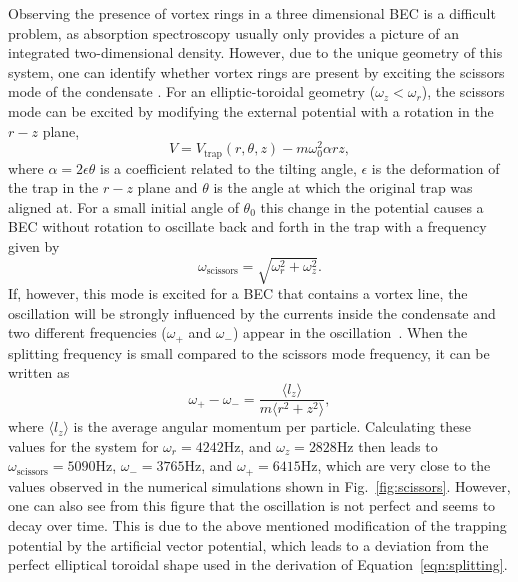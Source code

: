 Observing the presence of vortex rings in a three dimensional BEC is a difficult problem, as absorption spectroscopy usually only provides a picture of an integrated two-dimensional density.
However, due to the unique geometry of this system, one can identify whether vortex rings are present by exciting the scissors mode of the condensate \cite{cozzini2003, guery1999, marago2000}. 
For an elliptic-toroidal geometry ($\omega_z < \omega_r$), the scissors mode can be excited by modifying the external potential with a rotation in the $r-z$ plane,
\begin{equation}
        V = V_{\text{trap}}(r, \theta, z) -m\omega_0^2\alpha rz,
\end{equation}
where $\alpha = 2\epsilon\theta$ is a coefficient related to the tilting angle, $\epsilon$ is the deformation of the trap in the $r-z$ plane and $\theta$ is the angle at which the original trap was aligned at.
For a small initial angle of $\theta_0$ this change in the potential causes a BEC without rotation to oscillate back and forth in the trap with a frequency given by \cite{stringari2001}
\begin{equation}
        \omega_{\text{scissors}} = \sqrt{\omega_r^2+\omega_z^2}.
\end{equation}
If, however, this mode is excited for a BEC that contains a vortex line, the oscillation will be strongly influenced by the currents inside the condensate and two different frequencies ($\omega_+$ and $\omega_-$) appear in the oscillation~\cite{smith2004, zambelli1998, stringari2001}.
When the splitting frequency is small compared to the scissors mode frequency, it 
can be written as \cite{zambelli1998}
\begin{equation}
\omega_{+} - \omega_{-} = \frac{\langle l_z \rangle}{m\langle r^2 + z^2 \rangle},
\label{eqn:splitting}
\end{equation}
where $\langle l_z \rangle$ is the average angular momentum per particle.
Calculating these values for the system for $\omega_r = 4242$Hz, and $\omega_z = 2828$Hz then leads to $\omega_{\text{scissors}} = 5090$Hz, $\omega_{-} = 3765$Hz, and $\omega_{+} = 6415$Hz, which are very close to the values observed in the numerical simulations shown in Fig.~\ref{fig:scissors}.
However, one can also see from this figure that the oscillation is not perfect and seems to decay over time.
This is due to the above mentioned modification of the trapping potential by the artificial vector potential, which leads to a deviation from the perfect elliptical toroidal shape used in the derivation of Equation~\eqref{eqn:splitting}.

